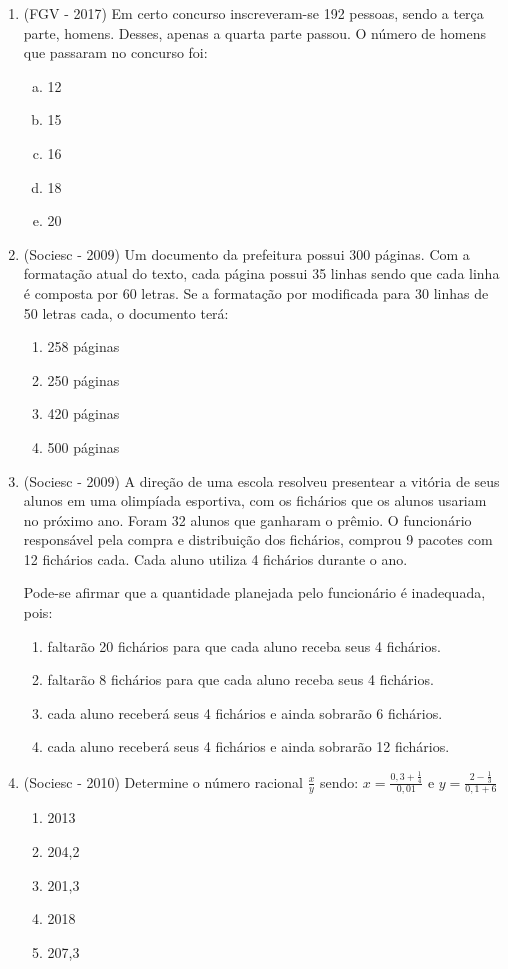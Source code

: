 \begin{enumerate}
  \item (FGV - 2017) Em certo concurso inscreveram-se 192 pessoas, sendo a terça parte, homens. Desses, apenas a quarta parte passou. O número de homens que passaram no concurso foi:
  \begin{enumerate}[a)]
  \item 12
  \item 15
  \item 16
  \item 18
  \item 20
  \end{enumerate}

   \item (Sociesc - 2009) Um documento da prefeitura possui 300 páginas. Com a formatação atual do texto, cada página possui 35 linhas sendo que cada linha é composta por 60 letras. Se a formatação por modificada para 30 linhas de 50 letras cada, o documento terá:
 \begin{enumerate}
  \item 258 páginas
  \item 250 páginas
  \item 420 páginas
  \item 500 páginas
 \end{enumerate}

 \item (Sociesc - 2009) A direção de uma escola resolveu presentear a vitória de seus alunos em uma olimpíada esportiva, com os fichários que os alunos usariam no próximo ano. Foram 32 alunos que ganharam o
 prêmio. O funcionário responsável pela compra e distribuição dos fichários, comprou 9 pacotes com 12 fichários cada. Cada aluno utiliza 4 fichários durante o ano.

 Pode-se afirmar que a quantidade planejada pelo funcionário é inadequada, pois:
 \begin{enumerate}
  \item faltarão 20 fichários para que cada aluno receba seus 4 fichários.
  \item faltarão 8 fichários para que cada aluno receba seus 4 fichários.
  \item cada aluno receberá seus 4 fichários e ainda sobrarão 6 fichários.
  \item cada aluno receberá seus 4 fichários e ainda sobrarão 12 fichários.
 \end{enumerate}

 \item (Sociesc - 2010) Determine o número racional $\frac{x}{y}$ sendo:
  $x=\frac{0,3 + \frac{1}{4}}{0,01}$ e $y=\frac{2-\frac{1}{3}}{0,1+6}$
  \begin{enumerate}
  \item 2013
  \item 204,2
  \item 201,3
  \item 2018
  \item 207,3
 \end{enumerate}


\end{enumerate}
